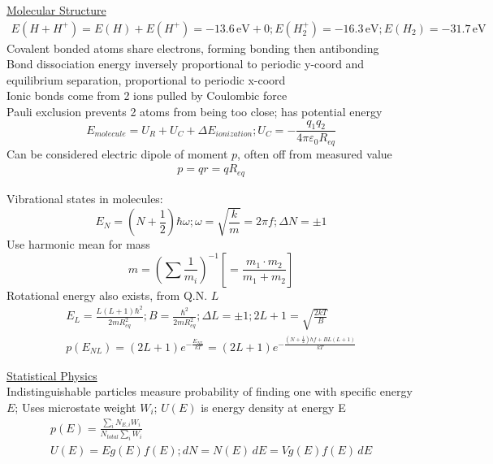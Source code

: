 \documentclass[8pt]{extarticle}
\newcommand{\e}[1]{e^{#1}}
\begin{document}
    \underline{Molecular Structure}
        \scriptsize
        \begin{gather*}
            E(H + H^+) = E(H) + E(H^+) = -13.6\,\unit{\eV} + 0; 
            E(H_2^+) = -16.3\,\unit{\eV};
            E(H_2) = -31.7\,\unit{\eV}
        \end{gather*}
        \normalsize
        Covalent bonded atoms share electrons, forming bonding then antibonding\\
        Bond dissociation energy inversely proportional to periodic y-coord and equilibrium separation, proportional to periodic x-coord\\
        Ionic bonds come from 2 ions pulled by Coulombic force\\
        Pauli exclusion prevents 2 atoms from being too close; has potential energy
        \begin{equation*}
            E_{molecule} = U_R + U_C + \Delta E_{ionization}; U_C = -\frac{q_1 q_2}{4\pi\varepsilon_0 R_{eq}}
        \end{equation*}
        Can be considered electric dipole of moment $p$, often off from measured value
        \begin{gather*}
            p = qr = qR_{eq}
        \end{gather*}

        Vibrational states in molecules:
        \begin{equation*}
            E_N = (N + \frac{1}{2})\hbar \omega; 
            \omega = \sqrt{\frac{k}{m}} = 2\pi f;
            \Delta N = \pm 1
        \end{equation*}
        Use harmonic mean for mass
        \begin{equation*}
            m = \left( \sum \frac{1}{m_i} \right)^{-1} \left[ = \frac{m_1 \cdot m_2}{m_1 + m_2} \right]
        \end{equation*}
        Rotational energy also exists, from Q.N. $L$
        \begin{gather*}
            E_L = \frac{L(L+1)\hbar^2}{2mR_{eq}^2};
            B = \frac{\hbar^2}{2mR_{eq}^2};
            \Delta L = \pm 1; 
            2L + 1 = \sqrt{\frac{2kT}{B}}\\
            p(E_{NL}) = (2L + 1)\e{-\frac{E_{NL}}{kT}} = (2L + 1)\e{-\frac{(N + \frac{1}{2})hf + BL(L + 1)}{kT}}
        \end{gather*}

    \underline{Statistical Physics}\\
        Indistinguishable particles measure probability of finding one with specific energy $E$; 
        Uses microstate weight $W_i$;
        $U(E)$ is energy density at energy E
        \begin{gather*}
            p(E) = \frac{\sum_{i}^{} N_{E,i} W_i}{N_{total} \sum_{i}^{}W_i}\\
            U(E) = E g(E) f(E);
            dN = N(E)\,dE = V g(E) f(E)\,dE
        \end{gather*}
\end{document}
